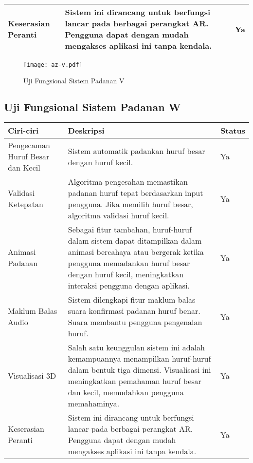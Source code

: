 \begin{itemize}
\begin{itemize}
\begin{itemize}
\begin{itemize}
\begin{itemize}
\begin{itemize}
\begin{itemize}
\begin{itemize}
\begin{flushleft}
\begin{tabular}{>{\raggedright}p{3cm}p{9cm}>{\centering\arraybackslash}p{2cm}}
Keserasian Peranti & Sistem ini dirancang untuk berfungsi lancar pada berbagai perangkat AR. Pengguna dapat dengan mudah mengakses aplikasi ini tanpa kendala. & Ya \\
\bottomrule
\end{tabular}

\begin{figure}
    \centering
    \texttt{[image: az-v.pdf]}
    \caption{Uji Fungsional  Sistem Padanan V }
    \label{fig:az-s.pdf}
\end{figure}
\subsection{Uji Fungsional  Sistem Padanan W}

\begin{tabular}{>{\raggedright}p{3cm}p{9cm}>{\centering\arraybackslash}p{2cm}}
\toprule
\textbf{Ciri-ciri} & \textbf{Deskripsi} & \textbf{Status} \\
\midrule
Pengecaman Huruf Besar dan Kecil & Sistem automatik padankan huruf besar dengan huruf kecil. & Ya \\

Validasi Ketepatan & Algoritma pengesahan memastikan padanan huruf tepat berdasarkan input pengguna. Jika memilih huruf besar, algoritma validasi huruf kecil. & Ya \\

Animasi Padanan & Sebagai fitur tambahan, huruf-huruf dalam sistem dapat ditampilkan dalam animasi bercahaya atau bergerak ketika pengguna memadankan huruf besar dengan huruf kecil, meningkatkan interaksi pengguna dengan aplikasi. & Ya \\

Maklum Balas Audio & Sistem dilengkapi fitur maklum balas suara konfirmasi padanan huruf benar. Suara membantu pengguna pengenalan huruf. & Ya \\

Visualisasi 3D & Salah satu keunggulan sistem ini adalah kemampuannya menampilkan huruf-huruf dalam bentuk tiga dimensi. Visualisasi ini meningkatkan pemahaman huruf besar dan kecil, memudahkan pengguna memahaminya. & Ya \\

Keserasian Peranti & Sistem ini dirancang untuk berfungsi lancar pada berbagai perangkat AR. Pengguna dapat dengan mudah mengakses aplikasi ini tanpa kendala. & Ya \\
\bottomrule
\end{tabular}


\end{flushleft}
\end{itemize}
\end{itemize}
\end{itemize}
\end{itemize}
\end{itemize}
\end{itemize}
\end{itemize}
\end{itemize}
